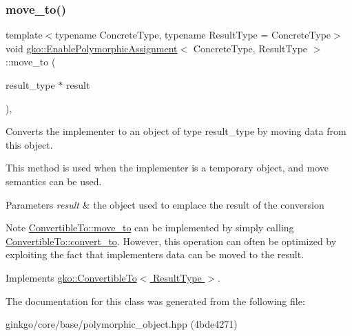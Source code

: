 \subsubsection{\texorpdfstring{move\+\_\+to()}{move\_to()}}
{\footnotesize\ttfamily template$<$typename Concrete\+Type, typename Result\+Type = Concrete\+Type$>$ \\
void \hyperlink{classgko_1_1EnablePolymorphicAssignment}{gko\+::\+Enable\+Polymorphic\+Assignment}$<$ Concrete\+Type, Result\+Type $>$\+::move\+\_\+to (\begin{DoxyParamCaption}\item[{result\+\_\+type $\ast$}]{result }\end{DoxyParamCaption})\hspace{0.3cm}{\ttfamily [override]}, {\ttfamily [virtual]}}



Converts the implementer to an object of type result\+\_\+type by moving data from this object. 

This method is used when the implementer is a temporary object, and move semantics can be used.


\begin{DoxyParams}{Parameters}
{\em result} & the object used to emplace the result of the conversion\\
\hline
\end{DoxyParams}
\begin{DoxyNote}{Note}
\hyperlink{classgko_1_1ConvertibleTo_ab9047c7c49e0f83c79b54c0034d6197b}{Convertible\+To\+::move\+\_\+to} can be implemented by simply calling \hyperlink{classgko_1_1ConvertibleTo_aa7f3420babcbed39ee15bc020bed4f7e}{Convertible\+To\+::convert\+\_\+to}. However, this operation can often be optimized by exploiting the fact that implementer\textquotesingle{}s data can be moved to the result. 
\end{DoxyNote}


Implements \hyperlink{classgko_1_1ConvertibleTo_ab9047c7c49e0f83c79b54c0034d6197b}{gko\+::\+Convertible\+To$<$ Result\+Type $>$}.



The documentation for this class was generated from the following file\+:\begin{DoxyCompactItemize}
\item 
ginkgo/core/base/polymorphic\+\_\+object.\+hpp (4bde4271)\end{DoxyCompactItemize}
